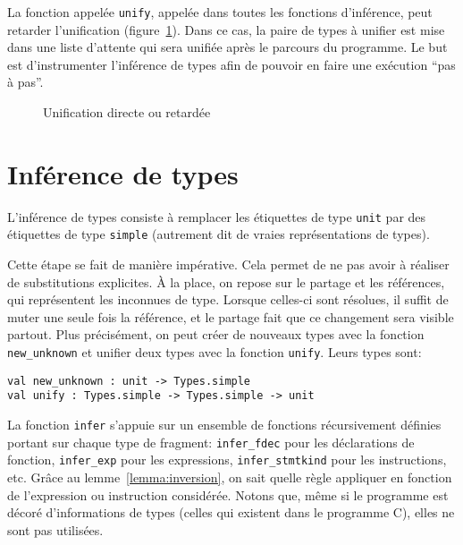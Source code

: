 La fonction appelée \texttt{unify}, appelée dans toutes les fonctions
d'inférence, peut retarder l'unification (figure~\ref{fig:implem-lazy}). Dans ce
cas, la paire de types à unifier est mise dans une liste d'attente qui sera
unifiée après le parcours du programme. Le but est d'instrumenter l'inférence de
types afin de pouvoir en faire une exécution \enquote{pas à pas}.

\begin{figure}


\caption{Unification directe ou retardée}
\label{fig:implem-lazy}
\end{figure}

\section{Inférence de types}

L'inférence de types consiste à remplacer les étiquettes de type \texttt{unit}
par des étiquettes de type \texttt{simple} (autrement dit de vraies
représentations de types).


Cette étape se fait de manière impérative. Cela permet de ne pas avoir à
réaliser de substitutions explicites. À la place, on repose sur le partage et
les références, qui représentent les inconnues de type. Lorsque celles-ci sont
résolues, il suffit de muter une seule fois la référence, et le partage fait que
ce changement sera visible partout. Plus précisément, on peut créer de nouveaux
types avec la fonction \texttt{new\_unknown} et unifier deux types avec la
fonction \texttt{unify}. Leurs types sont:

\begin{verbatim}
val new_unknown : unit -> Types.simple
val unify : Types.simple -> Types.simple -> unit
\end{verbatim}

La fonction \texttt{infer} s'appuie sur un ensemble de fonctions récursivement
définies portant sur chaque type de fragment: \texttt{infer\_fdec} pour les
déclarations de fonction, \texttt{infer\_exp} pour les expressions,
\texttt{infer\_stmtkind} pour les instructions, etc. Grâce au
lemme~\ref{lemma:inversion}, on sait quelle règle appliquer en fonction de
l'expression ou instruction considérée. Notons que, même si le programme
\newspeak est décoré d'informations de types (celles qui existent dans le
programme C), elles ne sont pas utilisées.

